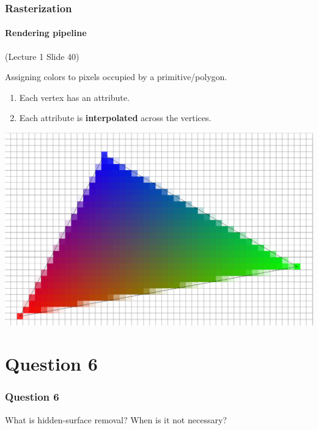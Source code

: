 \documentclass{beamer}
\begin{document}
\begin{frame}
    \frametitle{Rasterization}
    \framesubtitle{Rendering pipeline}

    (Lecture 1 Slide 40)

    Assigning colors to pixels occupied by a primitive/polygon.

    \begin{enumerate}
        \item Each vertex has an attribute.
        \item Each attribute is \textbf{interpolated} across the vertices.
    \end{enumerate}

    \vspace{1em}

    {\centering \includegraphics[scale=0.2]{rastertri.png}}

\end{frame}

\section{Question 6}

\begin{frame}
    \frametitle{Question 6}
    What is hidden-surface removal? When is it not necessary?
\end{frame}
\end{document}
